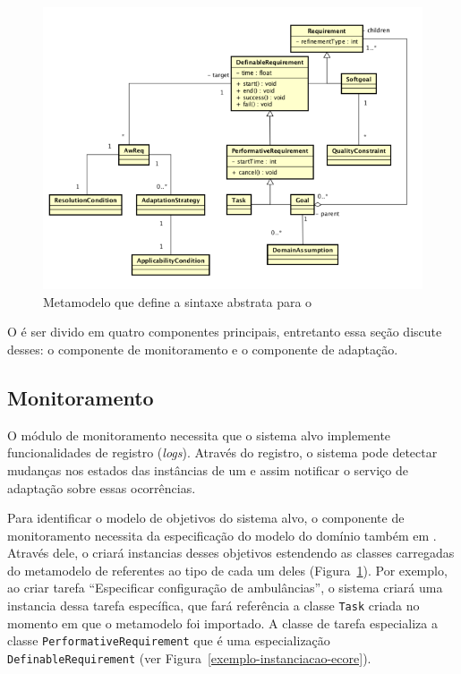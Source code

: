 \begin{figure}[h]
	\centering
	\includegraphics[width=1\textwidth]{figuras/metamodelos/metamodelo-zanshin-antigo.png}
	\caption{Metamodelo que define a sintaxe abstrata para o \zanshin}
	\label{figura-metamodelo-antigo}
\end{figure}

O \zanshin é ser divido em quatro componentes principais, entretanto essa seção discute desses: o componente de monitoramento e o componente de adaptação.

\subsection{Monitoramento}
\label{sec-referencial-zanshin-monitoramento}

O módulo de monitoramento necessita que o sistema alvo implemente funcionalidades de registro (\textit{logs}). Através do registro, o sistema pode detectar mudanças nos estados das instâncias de um \awreq e assim notificar o serviço de adaptação sobre essas ocorrências. 

Para identificar o modelo de objetivos do sistema alvo, o componente de monitoramento necessita da especificação do modelo do domínio também em \ecore. Através dele, o \zanshin criará instancias desses objetivos estendendo as classes carregadas do metamodelo de \gore referentes ao tipo de cada um deles (Figura~\ref{figura-metamodelo-antigo}). Por exemplo, ao criar tarefa ``Especificar configuração de ambulâncias'', o sistema criará uma instancia dessa tarefa específica, que fará referência a classe \texttt{Task} criada no momento em que o metamodelo foi importado. A classe de tarefa especializa a classe \texttt{PerformativeRequirement} que é uma especialização \texttt{DefinableRequirement} (ver Figura~\ref{exemplo-instanciacao-ecore}). 

